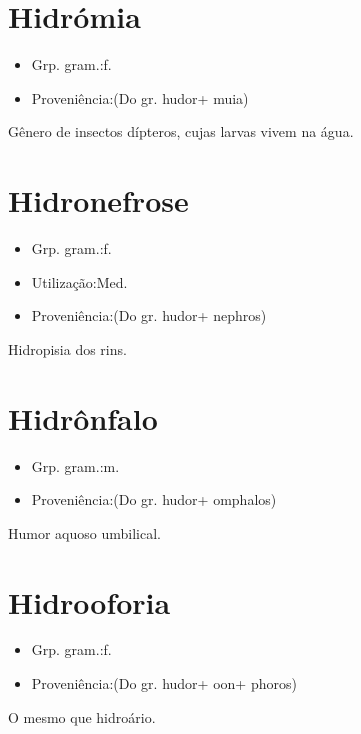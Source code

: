 \documentclass{article}
\begin{document}
\section{Hidrómia}
\begin{itemize}
\item {Grp. gram.:f.}
\end{itemize}
\begin{itemize}
\item {Proveniência:(Do gr. \textunderscore hudor\textunderscore  + \textunderscore muia\textunderscore )}
\end{itemize}
Gênero de insectos dípteros, cujas larvas vivem na água.
\section{Hidronefrose}
\begin{itemize}
\item {Grp. gram.:f.}
\end{itemize}
\begin{itemize}
\item {Utilização:Med.}
\end{itemize}
\begin{itemize}
\item {Proveniência:(Do gr. \textunderscore hudor\textunderscore  + \textunderscore nephros\textunderscore )}
\end{itemize}
Hidropisia dos rins.
\section{Hidrônfalo}
\begin{itemize}
\item {Grp. gram.:m.}
\end{itemize}
\begin{itemize}
\item {Proveniência:(Do gr. \textunderscore hudor\textunderscore  + \textunderscore omphalos\textunderscore )}
\end{itemize}
Humor aquoso umbilical.
\section{Hidrooforia}
\begin{itemize}
\item {Grp. gram.:f.}
\end{itemize}
\begin{itemize}
\item {Proveniência:(Do gr. \textunderscore hudor\textunderscore  + \textunderscore oon\textunderscore  + \textunderscore phoros\textunderscore )}
\end{itemize}
O mesmo que \textunderscore hidroário\textunderscore .
\end{document}
